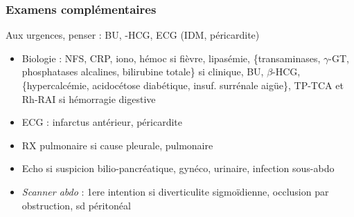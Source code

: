 \documentclass[11pt]{article}
\begin{document}
\subsubsection{Examens complémentaires}
\label{sec:org3584305}
\begin{tcolorbox}
Aux urgences, penser : BU, \beta-HCG, ECG (IDM, péricardite)
\end{tcolorbox}

\begin{itemize}
\item Biologie : NFS, CRP, iono, hémoc si fièvre, lipasémie, \{transaminases, \(\gamma\)-GT,
phosphatases alcalines, bilirubine totale\} si clinique, BU, \(\beta\)-HCG,
\{hypercalcémie, acidocétose diabétique, insuf. surrénale aigüe\}, TP-TCA et
Rh-RAI si hémorragie digestive
\item ECG : infarctus antérieur, péricardite
\item RX pulmonaire si cause pleurale, pulmonaire
\item Echo si suspicion bilio-pancréatique, gynéco, urinaire, infection sous-abdo
\item \emph{Scanner abdo} : 1ere intention si diverticulite sigmoïdienne, occlusion par
obstruction, sd péritonéal
\end{itemize}
\end{document}
